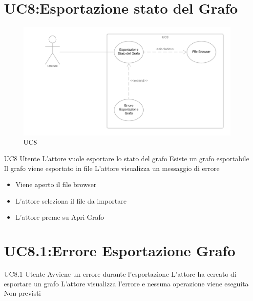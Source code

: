 \documentclass[../AnalisideiRequisiti.tex]{subfiles}
\begin{document}
\section{UC8:Esportazione stato del Grafo}
\begin{figure}[H]
	\caption{UC8}
	\centering
	\includegraphics[width=\textwidth]{../img/UC08.png}
\end{figure}
\UserCase
{UC8}
{Utente}
{}
{L'attore vuole esportare lo stato del grafo}
{Esiste un grafo esportabile}
{Il grafo viene esportato in file}
{ L'attore visualizza un messaggio di errore }
{
	{\begin{itemize}
			\item{} Viene aperto il file browser
			\item{} L'attore seleziona il file da importare
			\item{} L'attore preme su Apri Grafo
\end{itemize}}}

\section{UC8.1:Errore Esportazione Grafo}
\UserCase
{UC8.1}
{Utente}
{}
{Avviene un errore durante l'esportazione}
{L'attore ha cercato di esportare un grafo}
{L'attore visualizza l'errore e nessuna operazione viene eseguita}
{Non previsti}
{}
\end{document}
